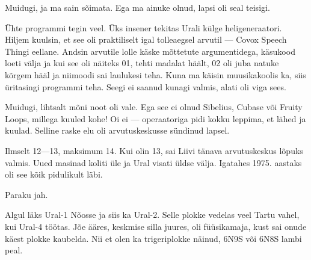 
Muidugi, ja ma sain sõimata. Ega ma ainuke olnud, lapsi oli seal
teisigi.

Ühte programmi tegin veel. Üks insener 
tekitas Urali külge heligeneraatori. Hiljem kuulsin, et 
see oli praktiliselt igal tolleaegsel arvutil --- Covox Speech 
Thingi 
eellane. Andsin arvutile lolle käske 
mõttetute argumentidega, käsukood loeti välja ja kui see oli näiteks 01, tehti 
madalat häält, 02 oli juba natuke kõrgem hääl ja niimoodi sai laulukesi 
teha. Kuna ma käisin muusikakoolis ka, siis üritasingi programmi teha. 
Seegi ei saanud kunagi valmis, alati oli viga sees. 


Muidugi, lihtsalt mõni noot oli vale. Ega see ei olnud 
Sibelius, Cubase või Fruity Loops, millega kuuled kohe! Oi ei --- operaatoriga pidi kokku leppima, et lähed ja kuulad. 
Selline raske elu oli arvutuskeskusse sündinud lapsel. 


Ilmselt 12---13, maksimum 
14. Kui olin 13, sai Liivi tänava arvutuskeskus lõpuks valmis. Uued masinad koliti üle 
ja Ural visati üldse välja. Igatahes 1975. 
aastaks oli see kõik pidulikult läbi. 


Paraku jah. 

Algul läks Ural-1 
Nõosse ja siis ka Ural-2. Selle
plokke vedelas veel Tartu vahel, kui Ural-4 töötas. Jõe 
ääres, keskmise silla juures, oli füüsikamaja, kust sai onude 
käest plokke kaubelda. Nii et olen ka trigeriplokke 
näinud, 6N9S või 6N8S lambi peal. 

